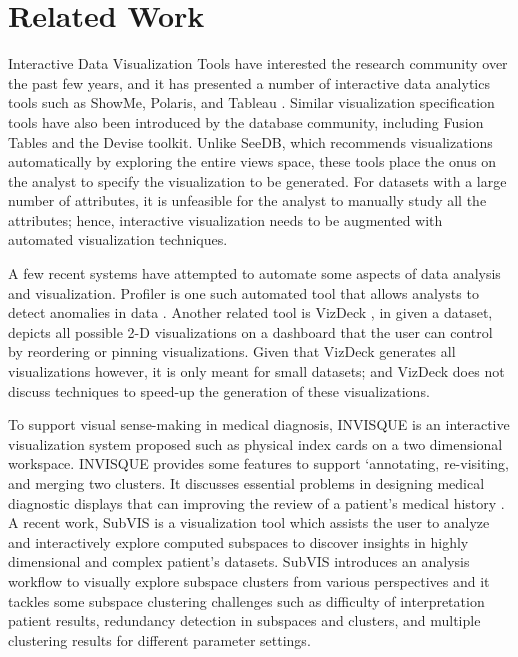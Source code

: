 \section{Related Work}
\label{sec:related}
%
Interactive Data Visualization Tools have interested the research community over the past few years, and it has presented a number of interactive data analytics tools such as ShowMe, Polaris, and Tableau \cite{kandel2012profiler,DBLP:journals/tvcg/MackinlayHS07,DBLP:conf/sigmod/KeyHPA12,DBLP:journals/tvcg/Fisher07}. 
%
Similar visualization specification tools have also been introduced by the database community, including Fusion Tables \cite{DBLP:conf/sigmod/GonzalezHJLMSSG10} and the Devise \cite{DBLP:conf/sigmod/LivnyRBCDLMW97} toolkit. 
%
Unlike SeeDB, which recommends visualizations automatically by exploring the entire views space, these tools place the onus on the analyst to specify the visualization to be generated. For datasets with a large number of attributes, it is unfeasible for the analyst to manually study all the attributes; hence, interactive visualization needs to be augmented with automated visualization techniques.
%

A few recent systems have attempted to automate some aspects of data analysis and visualization. Profiler is one such automated tool that allows analysts to detect anomalies in data \cite{kandel2012profiler}. Another related tool is VizDeck \cite{DBLP:conf/sigmod/KeyHPA12}, in given a dataset, depicts all possible 2-D visualizations on a dashboard that the user can control by reordering or pinning visualizations. Given that VizDeck generates all visualizations however, it is only meant for small datasets; and VizDeck does not discuss techniques to speed-up the generation of these visualizations.
%

To support visual sense-making in medical diagnosis, INVISQUE \cite{Wong2011,DBLP:conf/chi/WongCKRX11} is an interactive visualization system proposed such as physical index cards on a two dimensional
workspace. INVISQUE provides some features to support ‘annotating, re-visiting, and merging two clusters. It discusses essential problems in designing medical diagnostic displays that can improving the review of a patient’s medical history \cite{Wong2011}. A recent work, SubVIS \cite{Hund2016} is a visualization tool which assists the user to analyze and interactively explore computed subspaces to discover insights in highly dimensional and complex patient's datasets. SubVIS \cite{Hund2016} introduces an analysis workflow to visually explore subspace clusters from various perspectives and it tackles some subspace clustering challenges such as difficulty of interpretation patient results, redundancy detection in subspaces and clusters, and multiple clustering results for different parameter settings.    
%

